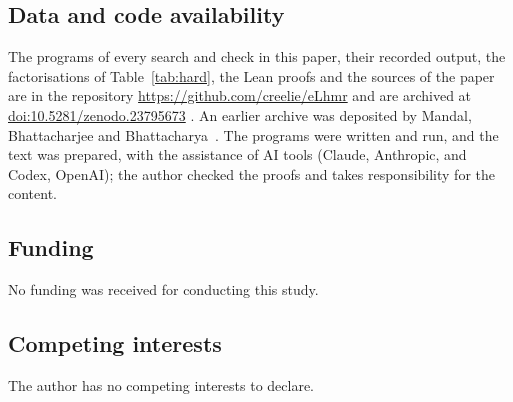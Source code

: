 \documentclass[11pt,reqno]{amsart}
\numberwithin{equation}{section}
\theoremstyle{plain}
\theoremstyle{definition}
\theoremstyle{remark}
\newcommand{\zenodoID}{10.5281/zenodo.23795673}
\begin{document}
\subsection*{Data and code availability}
The programs of every search and check in this paper, their recorded
output, the factorisations of Table~\ref{tab:hard}, the Lean proofs and
the sources of the paper are in the repository
\url{https://github.com/creelie/eLhmr} and are archived at
\href{https://doi.org/\zenodoID}{doi:\zenodoID} \cite{Data}. An earlier
archive was deposited by Mandal, Bhattacharjee and
Bhattacharya~\cite{EarlierData}. The programs were written and run, and
the text was prepared, with the assistance of AI tools (Claude,
Anthropic, and Codex, OpenAI); the author checked the proofs and takes
responsibility for the content.

\subsection*{Funding}
No funding was received for conducting this study.

\subsection*{Competing interests}
The author has no competing interests to declare.
\end{document}
